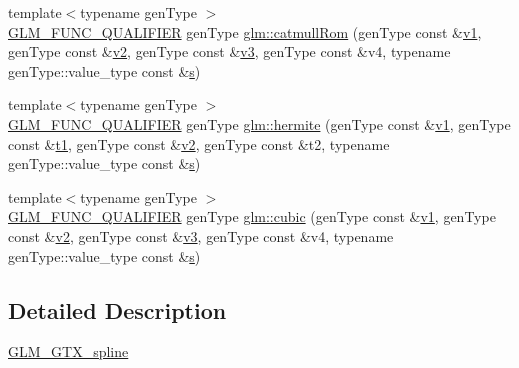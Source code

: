 \begin{DoxyCompactItemize}
\item 
{\footnotesize template$<$typename gen\+Type $>$ }\\\mbox{\hyperlink{setup_8hpp_a33fdea6f91c5f834105f7415e2a64407}{G\+L\+M\+\_\+\+F\+U\+N\+C\+\_\+\+Q\+U\+A\+L\+I\+F\+I\+ER}} gen\+Type \mbox{\hyperlink{group__gtx__spline_ga8119c04f8210fd0d292757565cd6918d}{glm\+::catmull\+Rom}} (gen\+Type const \&\mbox{\hyperlink{_s_d_l__opengl__glext_8h_a435c176a02c061b43e19bdf7c86cceae}{v1}}, gen\+Type const \&\mbox{\hyperlink{_s_d_l__opengl__glext_8h_a0928f6d0f0f794ba000a21dfae422136}{v2}}, gen\+Type const \&\mbox{\hyperlink{_s_d_l__opengl__glext_8h_acc806b31cbf466ceba6555983d8b814d}{v3}}, gen\+Type const \&v4, typename gen\+Type\+::value\+\_\+type const \&\mbox{\hyperlink{_s_d_l__opengl_8h_a4af680a6c683f88ed67b76f207f2e6e4}{s}})
\item 
{\footnotesize template$<$typename gen\+Type $>$ }\\\mbox{\hyperlink{setup_8hpp_a33fdea6f91c5f834105f7415e2a64407}{G\+L\+M\+\_\+\+F\+U\+N\+C\+\_\+\+Q\+U\+A\+L\+I\+F\+I\+ER}} gen\+Type \mbox{\hyperlink{group__gtx__spline_gaa69e143f6374d32f934a8edeaa50bac9}{glm\+::hermite}} (gen\+Type const \&\mbox{\hyperlink{_s_d_l__opengl__glext_8h_a435c176a02c061b43e19bdf7c86cceae}{v1}}, gen\+Type const \&\mbox{\hyperlink{_s_d_l__opengl__glext_8h_af48031a37b713afa3b0d0d7d29653d7c}{t1}}, gen\+Type const \&\mbox{\hyperlink{_s_d_l__opengl__glext_8h_a0928f6d0f0f794ba000a21dfae422136}{v2}}, gen\+Type const \&t2, typename gen\+Type\+::value\+\_\+type const \&\mbox{\hyperlink{_s_d_l__opengl_8h_a4af680a6c683f88ed67b76f207f2e6e4}{s}})
\item 
{\footnotesize template$<$typename gen\+Type $>$ }\\\mbox{\hyperlink{setup_8hpp_a33fdea6f91c5f834105f7415e2a64407}{G\+L\+M\+\_\+\+F\+U\+N\+C\+\_\+\+Q\+U\+A\+L\+I\+F\+I\+ER}} gen\+Type \mbox{\hyperlink{group__gtx__spline_ga6b867eb52e2fc933d2e0bf26aabc9a70}{glm\+::cubic}} (gen\+Type const \&\mbox{\hyperlink{_s_d_l__opengl__glext_8h_a435c176a02c061b43e19bdf7c86cceae}{v1}}, gen\+Type const \&\mbox{\hyperlink{_s_d_l__opengl__glext_8h_a0928f6d0f0f794ba000a21dfae422136}{v2}}, gen\+Type const \&\mbox{\hyperlink{_s_d_l__opengl__glext_8h_acc806b31cbf466ceba6555983d8b814d}{v3}}, gen\+Type const \&v4, typename gen\+Type\+::value\+\_\+type const \&\mbox{\hyperlink{_s_d_l__opengl_8h_a4af680a6c683f88ed67b76f207f2e6e4}{s}})
\end{DoxyCompactItemize}


\subsection{Detailed Description}
\mbox{\hyperlink{group__gtx__spline}{G\+L\+M\+\_\+\+G\+T\+X\+\_\+spline}} 